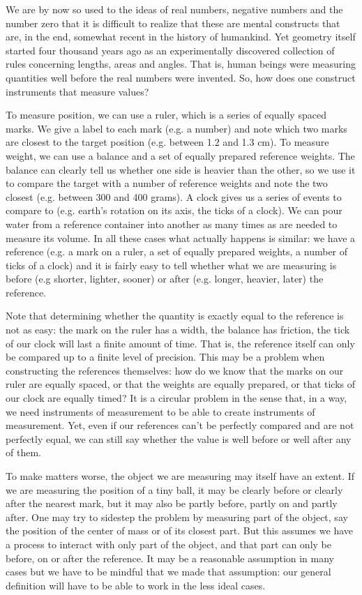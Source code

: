 We are by now so used to the ideas of real numbers, negative numbers and the number zero that it is difficult to realize that these are mental constructs that are, in the end, somewhat recent in the history of humankind. Yet geometry itself started four thousand years ago as an experimentally discovered collection of rules concerning lengths, areas and angles. That is, human beings were measuring quantities well before the real numbers were invented. So, how does one construct instruments that measure values?

To measure position, we can use a ruler, which is a series of equally spaced marks. We give a label to each mark (e.g. a number) and note which two marks are closest to the target position (e.g. between 1.2 and 1.3 cm). To measure weight, we can use a balance and a set of equally prepared reference weights. The balance can clearly tell us whether one side is heavier than the other, so we use it to compare the target with a number of reference weights and note the two closest (e.g. between 300 and 400 grams). A clock gives us a series of events to compare to (e.g. earth's rotation on its axis, the ticks of a clock). We can pour water from a reference container into another as many times as are needed to measure its volume. In all these cases what actually happens is similar: we have a reference (e.g. a mark on a ruler, a set of equally prepared weights, a number of ticks of a clock) and it is fairly easy to tell whether what we are measuring is before (e.g shorter, lighter, sooner) or after (e.g. longer, heavier, later) the reference.

Note that determining whether the quantity is exactly equal to the reference is not as easy: the mark on the ruler has a width, the balance has friction, the tick of our clock will last a finite amount of time. That is, the reference itself can only be compared up to a finite level of precision. This may be a problem when constructing the references themselves: how do we know that the marks on our ruler are equally spaced, or that the weights are equally prepared, or that ticks of our clock are equally timed? It is a circular problem in the sense that, in a way, we need instruments of measurement to be able to create instruments of measurement. Yet, even if our references can't be perfectly compared and are not perfectly equal, we can still say whether the value is well before or well after any of them.

To make matters worse, the object we are measuring may itself have an extent. If we are measuring the position of a tiny ball, it may be clearly before or clearly after the nearest mark, but it may also be partly before, partly on and partly after. One may try to sidestep the problem by measuring part of the object, say the position of the center of mass or of its closest part. But this assumes we have a process to interact with only part of the object, and that part can only be before, on or after the reference. It may be a reasonable assumption in many cases but we have to be mindful that we made that assumption: our general definition will have to be able to work in the less ideal cases.


